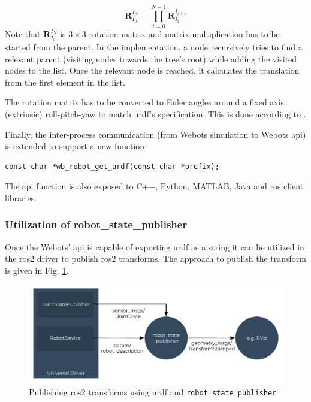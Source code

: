 \begin{equation}
    \bm{R}_{I_0}^{I_N} = \prod_{i=0}^{N-1} \bm{R}_{I_i}^{I_{i+1}}
\end{equation}
Note that $ \bm{R}_{I_0}^{I_N} $ is $ 3 \times 3 $ rotation matrix and matrix multiplication has to be started from the parent. In the implementation, a node recursively tries to find a relevant parent (visiting nodes towards the tree's root) while adding the visited nodes to the list. Once the relevant node is reached, it calculates the translation from the first element in the list.

The rotation matrix has to be converted to Euler angles around a fixed axis (extrinsic) roll-pitch-yaw to match \ac{urdf}'s specification. This is done according to \cite[p. 9]{eberly_euler_nodate}.

Finally, the inter-process communication (from Webots simulation to Webots \ac{api}) is extended to support a new function:

\begin{verbatim}
const char *wb_robot_get_urdf(const char *prefix);
\end{verbatim}

The \ac{api} function is also exposed to C++, Python, MATLAB, Java and \ac{ros} client libraries.

\subsubsection{Utilization of robot\_state\_publisher}

Once the Webots' \ac{api} is capable of exporting \ac{urdf} as a string it can be utilized in the \ac{ros2} driver to publish \ac{ros2} transforms. The approach to publish the transform is given in Fig. \ref{fig:generalization:transforms_method_3}.

\begin{figure}[H]
    \centering
    \includegraphics[width=\textwidth]{generalization/figures/transforms_method_3.pdf}
    \caption{Publishing \ac{ros2} transforms using \ac{urdf} and \texttt{robot\_state\_publisher}}
    \label{fig:generalization:transforms_method_3}
\end{figure}

